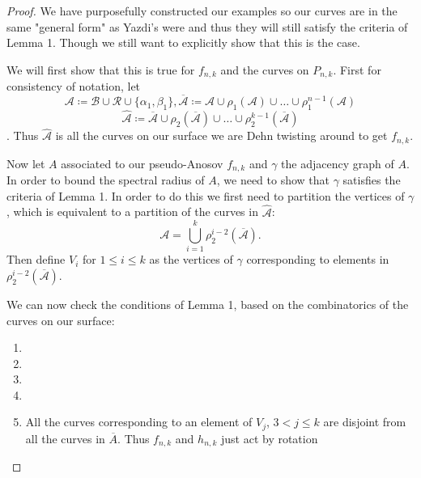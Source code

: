 \begin{proof}
We have purposefully constructed our examples so our curves are in the same "general form" as Yazdi's were and thus they will still satisfy the criteria of Lemma 1. Though we still want to explicitly show that this is the case.

We will first show that this is true for $f_{n,k}$ and the curves on $P_{n,k}$. First for consistency of notation, let
$$\mathcal{A} \coloneqq \mathcal{B} \cup \mathcal{R} \cup \{\alpha_1,\beta_1\}, \overline{\mathcal{A}} \coloneqq \mathcal{A} \cup \rho_1(\mathcal{A}) \cup \dots \cup \rho_1^{n-1}(\mathcal{A})$$
$$\hat{\mathcal{A}} \coloneqq \overline{\mathcal{A}} \cup \rho_2(\overline{\mathcal{A}}) \cup \dots \cup \rho_2^{k-1}(\overline{\mathcal{A}})$$. Thus $\hat{\mathcal{A}}$ is all the curves on our surface we are Dehn twisting around to get $f_{n,k}$. 

Now let $A$ associated to our pseudo-Anosov $f_{n,k}$ and $\gamma$ the adjacency graph of $A$. In order to bound the spectral radius of $A$, we need to show that $\gamma$ satisfies the criteria of Lemma 1. In order to do this we first need to partition the vertices of $\gamma$, which is equivalent to a partition of the curves in $\hat{\mathcal{A}}$: $$\mathcal{A} = \bigcup_{i=1}^k \rho_2^{i-2}(\overline{\mathcal{A}}).$$ Then define $V_i$ for $1 \leq i \leq k$ as the vertices of $\gamma$ corresponding to elements in $\rho_2^{i-2}(\overline{\mathcal{A}})$.

We can now check the conditions of Lemma 1, based on the combinatorics of the curves on our surface:
\begin{enumerate}
    \item 
    \item 
    \item 
    \item 
    \item All the curves corresponding to an element of $V_j$, $3 < j \leq k$ are disjoint from all the curves in $\overline{A}$. Thus $f_{n,k}$ and $h_{n,k}$ just act by rotation
\end{enumerate}

\end{proof}

